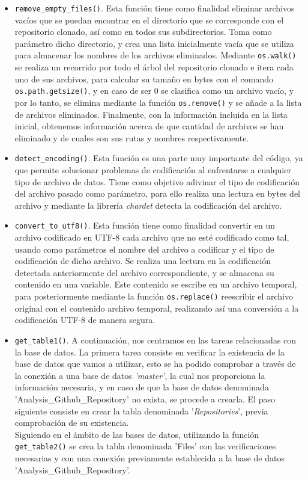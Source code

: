 \documentclass[a4paper, 12pt]{book}
\begin{document}
\begin{itemize}
  \item \texttt{remove\_empty\_files()}. Esta función tiene como finalidad eliminar archivos vacíos que se puedan encontrar en el directorio que se corresponde con el repositorio clonado, así como en todos sus subdirectorios.
  Toma como parámetro dicho directorio, y crea una lista inicialmente vacía que se utiliza para almacenar los nombres de los archivos eliminados. Mediante \texttt{os.walk()} se realiza un recorrido por todo el árbol del repositorio
  clonado e itera cada uno de sus archivos, para calcular su tamaño en bytes con el comando \texttt{os.path.getsize()}, y en caso de ser 0 se clasifica como un archivo vacío, y por lo tanto, se elimina mediante la función \texttt{os.remove()}
  y se añade a la lista de archivos eliminados. Finalmente, con la información incluida en la lista inicial, obtenemos información acerca de que cantidad de archivos se han eliminado y de cuales son sus rutas y nombres respectivamente.
  
  \item \texttt{detect\_encoding()}. Esta función es una parte muy importante del código, ya que permite solucionar problemas de codificación al enfrentarse a cualquier tipo de archivo de datos. Tiene como objetivo adivinar el tipo de
  codificación del archivo pasado como parámetro, para ello realiza una lectura en bytes del archivo y mediante la librería \textit{chardet} detecta la codificación del archivo.
  
  \item \texttt{convert\_to\_utf8()}. Esta función tiene como finalidad convertir en un archivo codificado en UTF-8 cada archivo que no esté codificado como tal, usando como parámetros el nombre del archivo a codificar y el tipo de codificación de dicho archivo.
  Se realiza una lectura en la codificación detectada anteriormente del archivo correspondiente, y se almacena su contenido en una variable. Este contenido se escribe en un archivo temporal, para posteriormente mediante la función \texttt{os.replace()}
  reescribir el archivo original con el contenido archivo temporal, realizando así una conversión a la codificación UTF-8 de manera segura. 

  \item \texttt{get\_table1()}. A continuación, nos centramos en las tareas relacionadas con la base de datos. La primera tarea consiste en verificar la existencia de la base de datos que vamos a utilizar, esto se ha podido comprobar a través de la conexión a una base de datos
  \textit{'master'}, la cual nos proporciona la información necesaria, y en caso de que la base de datos denominada 'Analysis\_Github\_Repository' no exista, se procede a crearla. El paso siguiente consiste en crear la tabla denominada '\textit{Repositories}', previa comprobación de su existencia.
  \\Siguiendo en el ámbito de las bases de datos, utilizando la función \texttt{get\_table2()} se crea la tabla denominada 'Files' con las verificaciones necesarias y con una conexión previamente establecida a la base de datos 'Analysis\_Github\_Repository'.


\end{itemize}
\end{document}
